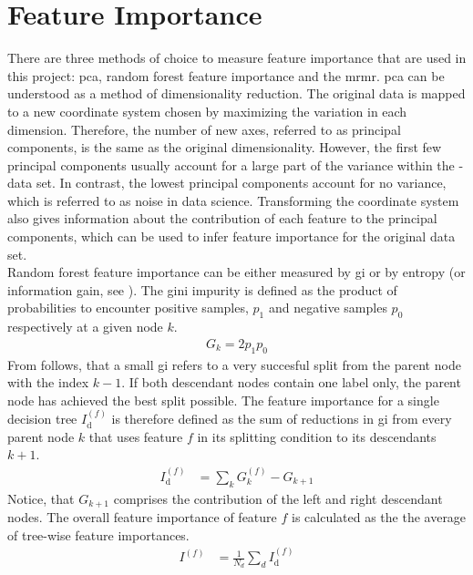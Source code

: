 \section{Feature Importance}\label{sec:featimport}
There are three methods of choice to measure feature importance that are used in this project: \ac{pca}, random forest feature importance and the \ac{mrmr}. \ac{pca} can be understood as a method of dimensionality reduction. The original data is mapped to a new coordinate system chosen by maximizing the variation in each dimension.\cite{Jolliffe2002} Therefore, the number of new axes, referred to as principal components, is the same as the original dimensionality. However, the first few principal components usually account for a large part of the variance within the -data set. In contrast, the lowest principal components account for no variance, which is referred to as noise in data science.\cite{Forsyth2019} Transforming the coordinate system also gives information about the contribution of each feature to the principal components, which can be used to infer feature importance for the original data set.\cite{Jolliffe2002}\\
Random forest feature importance can be either measured by \acl{gi} or by entropy (or information gain, see ). The gini impurity is defined as the product of probabilities to encounter positive samples, $p_1$ and negative samples $p_0$ respectively at a given node $k$.\cite{Zhang2012}
\begin{align}\label{eq:giniimpfornode}
G_k = 2p_1p_0
\end{align}
From  follows, that a small \acl{gi} refers to a very succesful split from the parent node with the index $k-1$. If both descendant nodes contain one label only, the parent node has achieved the best split possible. The feature importance for a single decision tree $I^{(f)}_\text{d}$ is therefore defined as the sum of reductions in \acl{gi} from every parent node $k$ that uses feature $f$ in its splitting condition to its descendants $k+1$.\cite{Zhang2012}
\begin{align}\label{eq:giniimptree}
I^{(f)}_\text{d} & = \sum_{k} G_{k}^{(f)} - G_{k+1}
\end{align}
Notice, that $G_{k+1}$ comprises the contribution of the left and right descendant nodes. The overall feature importance of feature $f$ is calculated as the the average of tree-wise feature importances.\cite{Zhang2012}
\begin{align}\label{eq:giniimpforest}
I^{(f)} & = \frac{1}{N_d}\sum_{d}I^{(f)}_\text{d}
\end{align}
